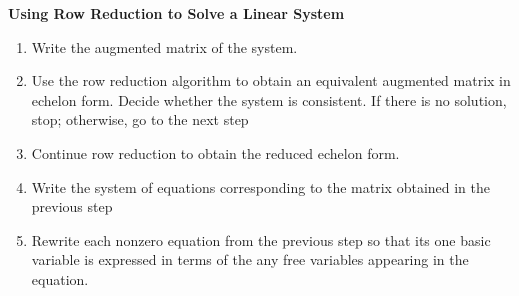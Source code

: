 \documentclass[10pt]{book}
\newenvironment{boxdef}{\begin{mdframed}[backgroundcolor=gray!30,linewidth=0pt,nobreak=true]}{\end{mdframed}}
\begin{document}
\begin{boxdef}
	\textbf{Using Row Reduction to Solve a Linear System}
	\begin{enumerate}
		\item Write the augmented matrix of the system.
		\item Use the row reduction algorithm to obtain an equivalent augmented matrix in echelon form. Decide whether the system is consistent. If there is no solution, stop; otherwise, go to the next step
		\item Continue row reduction to obtain the reduced echelon form.
		\item Write the system of equations corresponding to the matrix obtained in the previous step
		\item Rewrite each nonzero equation from the previous step so that its one basic variable is expressed in terms of the any free variables appearing in the equation.
	\end{enumerate}
\end{boxdef}

\end{document}
